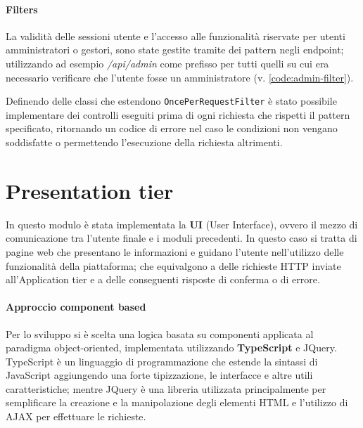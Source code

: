 

\paragraph{Filters}
La validità delle sessioni utente e l'accesso alle funzionalità riservate per
utenti amministratori o gestori, sono state gestite tramite dei pattern negli
endpoint; utilizzando ad esempio \textit{/api/admin} come prefisso per tutti
quelli su cui era necessario verificare che l'utente fosse un amministratore
(v. \ref{code:admin-filter}).

Definendo delle classi che estendono \texttt{OncePerRequestFilter} è stato
possibile implementare dei controlli eseguiti prima di ogni richiesta che rispetti
il pattern specificato, ritornando un codice di errore nel caso le condizioni
non vengano soddisfatte o permettendo l'esecuzione della richiesta altrimenti.





\section{Presentation tier}

In questo modulo è stata implementata la \textbf{UI} (User Interface), ovvero il
mezzo di comunicazione tra l'utente finale e i moduli precedenti. In questo caso
si tratta di pagine web che presentano le informazioni e guidano l'utente nell'utilizzo
delle funzionalità della piattaforma; che equivalgono a delle richieste HTTP
inviate all'Application tier e a delle conseguenti risposte di conferma o di errore.

\paragraph{Approccio component based}
Per lo sviluppo si è scelta una logica basata su componenti applicata al
paradigma object-oriented, implementata utilizzando \textbf{TypeScript} e JQuery.
TypeScript è un linguaggio di programmazione che estende la sintassi di JavaScript
aggiungendo una forte tipizzazione, le interfacce e altre utili caratteristiche;
mentre JQuery è una libreria utilizzata principalmente per semplificare la
creazione e la manipolazione degli elementi HTML e l'utilizzo di AJAX per
effettuare le richieste.

